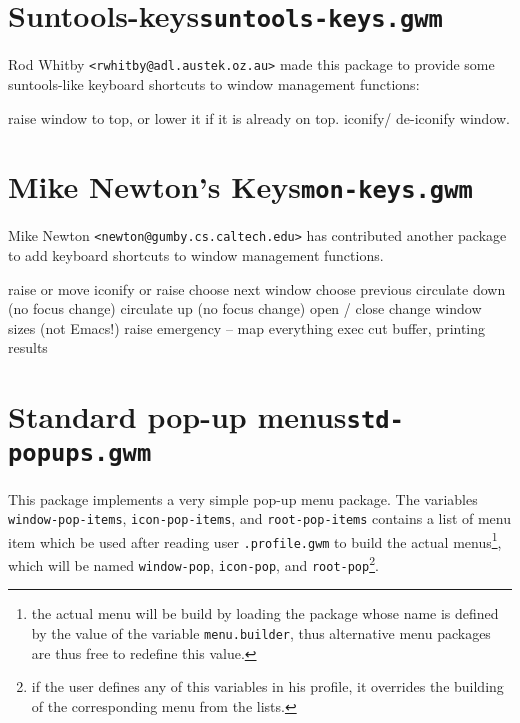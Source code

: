 \section{Suntools-keys\hfill{\tt suntools-keys.gwm}}
\label{suntools-keys}

Rod Whitby \verb|<rwhitby@adl.austek.oz.au>| made this package to
provide some suntools-like keyboard shortcuts to window management functions:

\begin{description}
 raise window to top, or lower it if it is already on top.
 iconify/ de-iconify window.
\end{description}

\section{Mike Newton's Keys\hfill{\tt mon-keys.gwm}}
\label{mon-keys}

Mike Newton \verb|<newton@gumby.cs.caltech.edu>| has contributed another
package to add keyboard shortcuts to window management functions.

\begin{description}
 raise or move
 iconify or raise
 choose next window
 choose previous
 circulate down (no focus change)
 circulate up (no focus change)
 open / close
 change window sizes (not Emacs!)
 raise 
 emergency -- map everything
 exec cut buffer, printing results
\end{description}       

\section{Standard pop-up menus\hfill{\tt std-popups.gwm}}
\label{std-popups}

This package implements a very simple pop-up menu package. The variables
\verb"window-pop-items", \verb"icon-pop-items", and \verb"root-pop-items"
contains a list of menu item which be used after reading user
\verb".profile.gwm" to build the actual menus\footnote{the actual menu will be
build by loading the package whose name is defined by the value of the
variable \verb"menu.builder", thus alternative menu packages are thus free to
redefine this value.},
which will be named \verb"window-pop", \verb"icon-pop", and
\verb"root-pop"\footnote{if the user defines any of this variables in his
profile, it overrides the building of the corresponding menu from the lists.}.

